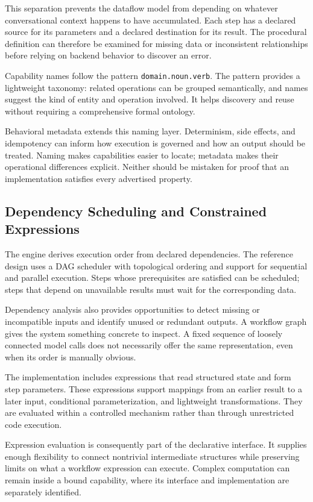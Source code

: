 \documentclass[10pt,twocolumn,a4paper]{article}
\begin{document}
This separation prevents the dataflow model from depending on whatever conversational context happens to have accumulated. Each step has a declared source for its parameters and a declared destination for its result. The procedural definition can therefore be examined for missing data or inconsistent relationships before relying on backend behavior to discover an error.


Capability names follow the pattern {\small{}\nolinkurl{domain.noun.verb}}. The pattern provides a lightweight taxonomy: related operations can be grouped semantically, and names suggest the kind of entity and operation involved. It helps discovery and reuse without requiring a comprehensive formal ontology.


Behavioral metadata extends this naming layer. Determinism, side effects, and idempotency can inform how execution is governed and how an output should be treated. Naming makes capabilities easier to locate; metadata makes their operational differences explicit. Neither should be mistaken for proof that an implementation satisfies every advertised property.


\subsection{Dependency Scheduling and Constrained Expressions}

The engine derives execution order from declared dependencies. The reference design uses a DAG scheduler with topological ordering and support for sequential and parallel execution. Steps whose prerequisites are satisfied can be scheduled; steps that depend on unavailable results must wait for the corresponding data.


Dependency analysis also provides opportunities to detect missing or incompatible inputs and identify unused or redundant outputs. A workflow graph gives the system something concrete to inspect. A fixed sequence of loosely connected model calls does not necessarily offer the same representation, even when its order is manually obvious.


The implementation includes expressions that read structured state and form step parameters. These expressions support mappings from an earlier result to a later input, conditional parameterization, and lightweight transformations. They are evaluated within a controlled mechanism rather than through unrestricted code execution.


Expression evaluation is consequently part of the declarative interface. It supplies enough flexibility to connect nontrivial intermediate structures while preserving limits on what a workflow expression can execute. Complex computation can remain inside a bound capability, where its interface and implementation are separately identified.
\end{document}

